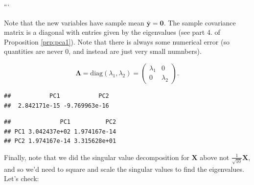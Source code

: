 \documentclass[]{book}
\newenvironment{Shaded}{\begin{snugshade}}{\end{snugshade}}
\newcommand{\CommentTok}[1]{\textcolor[rgb]{0.56,0.35,0.01}{\textit{#1}}}
\newcommand{\DecValTok}[1]{\textcolor[rgb]{0.00,0.00,0.81}{#1}}
\newcommand{\KeywordTok}[1]{\textcolor[rgb]{0.13,0.29,0.53}{\textbf{#1}}}
\newcommand{\NormalTok}[1]{#1}
\newcommand{\OperatorTok}[1]{\textcolor[rgb]{0.81,0.36,0.00}{\textbf{#1}}}
\theoremstyle{definition}
\theoremstyle{definition}
\theoremstyle{definition}
\theoremstyle{remark}
\begin{document}
```

Note that the new variables have sample mean \(\bar{\mathbf y}=\boldsymbol 0\). The sample covariance matrix is a diagonal with entries given by the eigenvalues (see part 4. of Proposition \ref{prp:pca1}). Note that there is always some numerical error (so quantities are never 0, and instead are just very small numnbers).

\[
\boldsymbol \Lambda= \text{diag}(\lambda_1,\lambda_2) =  \begin{pmatrix} \lambda_1 & 0 \\ 0 & \lambda_2 \end{pmatrix}.
\]

\begin{Shaded}
\end{Shaded}

\begin{verbatim}
##           PC1           PC2 
##  2.842171e-15 -9.769963e-16
\end{verbatim}

\begin{Shaded}
\end{Shaded}

\begin{verbatim}
##              PC1          PC2
## PC1 3.042437e+02 1.974167e-14
## PC2 1.974167e-14 3.315628e+01
\end{verbatim}

Finally, note that we did the singular value decomposition for \(\mathbf X\) above not \(\frac{1}{\sqrt{10}}\mathbf X\), and so we'd need to square and scale the singular values to find the eigenvalues. Let's check:

\begin{Shaded}
\end{Shaded}
\end{document}
